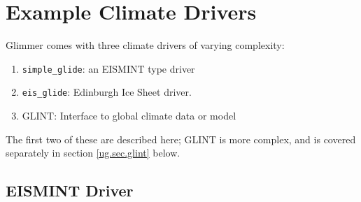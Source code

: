 \section{Example Climate Drivers}
Glimmer comes with three climate drivers of varying complexity:
\begin{enumerate}
 \item \texttt{simple\_glide}: an EISMINT type driver
 \item \texttt{eis\_glide}: Edinburgh Ice Sheet driver.
 \item GLINT: Interface to global climate data or model
\end{enumerate}
The first two of these are described here; GLINT is more complex, and
is covered separately in section \ref{ug.sec.glint} below.

\subsection{EISMINT Driver}\label{driver:eismint}
